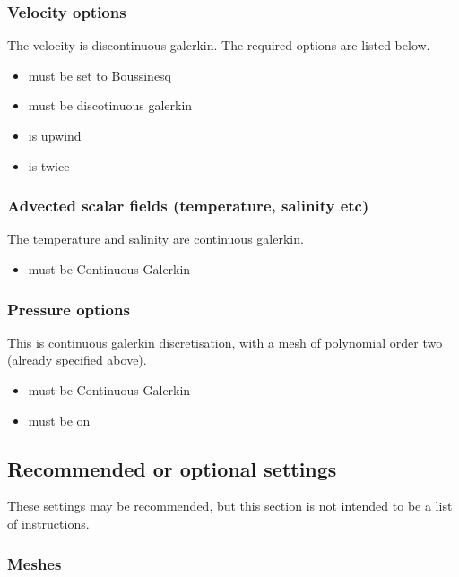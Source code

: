 \subsubsection{Velocity options}
The velocity is discontinuous galerkin.  The required options are listed below.

\begin{itemize}
\item {} must be set to Boussinesq
\item {} must be discotinuous galerkin
\item {} is upwind
\item {} is twice
\end{itemize}

\subsubsection{Advected scalar fields (temperature, salinity etc)}
The temperature and salinity are continuous galerkin. 

\begin{itemize}
\item {} must be Continuous Galerkin
\end{itemize}

\subsubsection{Pressure options}

This is continuous galerkin discretisation, with a mesh of polynomial order two (already specified above).

\begin{itemize}
\item {} must be Continuous Galerkin
\item {} must be on
\end{itemize}

\subsection{Recommended or optional settings}
These settings may be recommended, but this section is not intended to be a list of instructions.

\subsubsection{Meshes}


